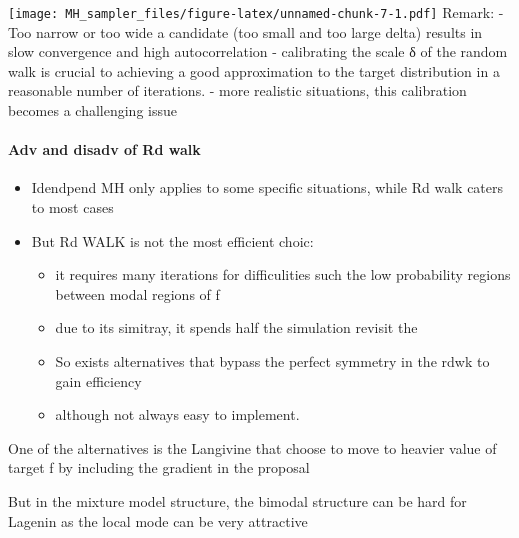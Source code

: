 \documentclass[
]{article}
\providecommand{\tightlist}{%
  \setlength{\itemsep}{0pt}\setlength{\parskip}{0pt}}
\begin{document}
\texttt{[image: MH\_sampler\_files/figure-latex/unnamed-chunk-7-1.pdf]}
Remark: - Too narrow or too wide a candidate (too small and too large
delta) results in slow convergence and high autocorrelation -
calibrating the scale δ of the random walk is crucial to achieving a
good approximation to the target distribution in a reasonable number of
iterations. - more realistic situations, this calibration becomes a
challenging issue

\hypertarget{adv-and-disadv-of-rd-walk}{%
\paragraph{Adv and disadv of Rd walk}\label{adv-and-disadv-of-rd-walk}}

\begin{itemize}
\tightlist
\item
  Idendpend MH only applies to some specific situations, while Rd walk
  caters to most cases
\item
  But Rd WALK is not the most efficient choic:

  \begin{itemize}
  \tightlist
  \item
    it requires many iterations for difficulities such the low
    probability regions between modal regions of f
  \item
    due to its simitray, it spends half the simulation revisit the
  \item
    So exists alternatives that bypass the perfect symmetry in the rdwk
    to gain efficiency
  \item
    although not always easy to implement.
  \end{itemize}
\end{itemize}

One of the alternatives is the Langivine that choose to move to heavier
value of target f by including the gradient in the proposal

But in the mixture model structure, the bimodal structure can be hard
for Lagenin as the local mode can be very attractive
\end{document}

